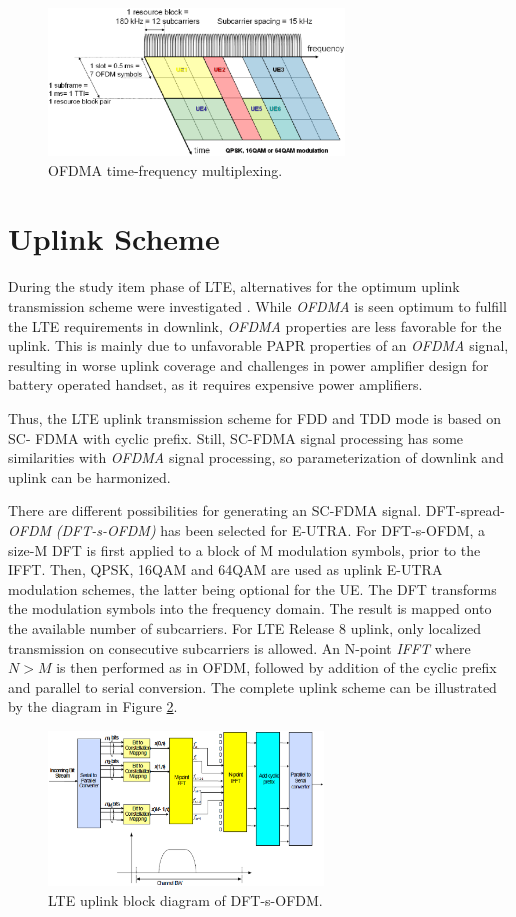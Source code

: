 \begin{figure}[htbp]
    \centering
    \includegraphics[width=0.70\textwidth]{./figures/downlink_channels}
    \caption{ OFDMA time-frequency multiplexing.
    \label{fig:dlchann}}
\end{figure}


\section{Uplink Scheme}%

During the study item phase of LTE, alternatives for the optimum uplink
transmission scheme were investigated \cite{umtslte}. While \textit{OFDMA} is
seen optimum to fulfill the LTE requirements in downlink, \textit{OFDMA}
properties are less favorable for the uplink. This is mainly due to unfavorable
PAPR properties of an \textit{OFDMA} signal, resulting in worse uplink coverage
and challenges in power amplifier design for battery operated handset, as it
requires expensive power amplifiers.

Thus, the LTE uplink transmission scheme for FDD and TDD mode is based on SC-
FDMA with cyclic prefix. Still, SC-FDMA signal processing has some similarities
with \textit{OFDMA} signal processing, so parameterization of downlink and
uplink can be harmonized.

There are different possibilities for generating an SC-FDMA signal. DFT-spread-
\textit{OFDM} \textit{(DFT-s-OFDM)} has been selected for E-UTRA. For
DFT-s-OFDM, a size-M DFT is first applied to a block of M modulation symbols,
prior to the IFFT. Then, QPSK, 16QAM and 64QAM are used as uplink E-UTRA
modulation schemes, the latter being optional for the UE. The DFT transforms the
modulation symbols into the frequency domain. The result is mapped onto the
available number of subcarriers. For LTE Release 8 uplink, only localized
transmission on consecutive subcarriers is allowed. An N-point \textit{IFFT}
where $N>M$ is then performed as in OFDM, followed by addition of the cyclic
prefix and parallel to serial conversion. The complete uplink scheme can be
illustrated by the diagram in Figure \ref{fig:uplinkbd}.

\begin{figure}[htbp]
    \centering
    \includegraphics[width=0.65\textwidth]{./figures/uplink_scheme}
    \caption{ LTE uplink block diagram of DFT-s-OFDM.
    \label{fig:uplinkbd}}
\end{figure}
